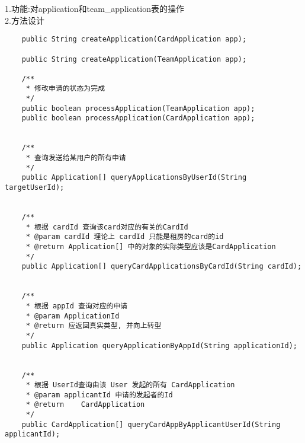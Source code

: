 1.功能:对application和team\_application表的操作 \\
2.方法设计
\begin{lstlisting}
    public String createApplication(CardApplication app);

    public String createApplication(TeamApplication app);

    /**
     * 修改申请的状态为完成
     */
    public boolean processApplication(TeamApplication app); 
    public boolean processApplication(CardApplication app); 


    /**
     * 查询发送给某用户的所有申请
     */
    public Application[] queryApplicationsByUserId(String targetUserId);


    /**
     * 根据 cardId 查询该card对应的有关的CardId
     * @param cardId 理论上 cardId 只能是租房的card的id
     * @return Application[] 中的对象的实际类型应该是CardApplication
     */
    public Application[] queryCardApplicationsByCardId(String cardId);


    /**
     * 根据 appId 查询对应的申请
     * @param ApplicationId
     * @return 应返回真实类型, 并向上转型
     */
    public Application queryApplicationByAppId(String applicationId);


    /**
     * 根据 UserId查询由该 User 发起的所有 CardApplication
     * @param applicantId 申请的发起者的Id
     * @return    CardApplication
     */
    public CardApplication[] queryCardAppByApplicantUserId(String applicantId);
\end{lstlisting}

